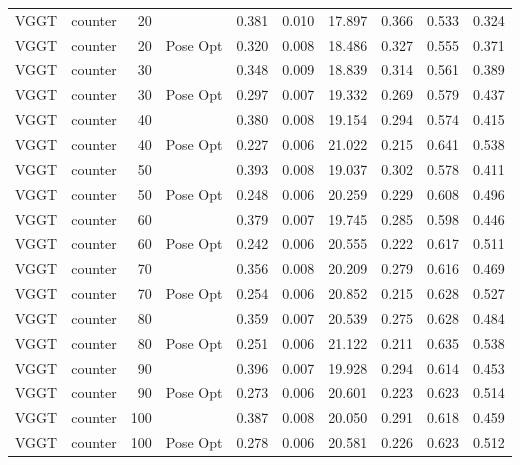 \begin{table}[H]
\begin{tabular}{llrlrrrrrr}
VGGT & counter & 20 &  & 0.381 & 0.010 & 17.897 & 0.366 & 0.533 & 0.324 \\
VGGT & counter & 20 & Pose Opt & 0.320 & 0.008 & 18.486 & 0.327 & 0.555 & 0.371 \\
VGGT & counter & 30 &  & 0.348 & 0.009 & 18.839 & 0.314 & 0.561 & 0.389 \\
VGGT & counter & 30 & Pose Opt & 0.297 & 0.007 & 19.332 & 0.269 & 0.579 & 0.437 \\
VGGT & counter & 40 &  & 0.380 & 0.008 & 19.154 & 0.294 & 0.574 & 0.415 \\
VGGT & counter & 40 & Pose Opt & 0.227 & 0.006 & 21.022 & 0.215 & 0.641 & 0.538 \\
VGGT & counter & 50 &  & 0.393 & 0.008 & 19.037 & 0.302 & 0.578 & 0.411 \\
VGGT & counter & 50 & Pose Opt & 0.248 & 0.006 & 20.259 & 0.229 & 0.608 & 0.496 \\
VGGT & counter & 60 &  & 0.379 & 0.007 & 19.745 & 0.285 & 0.598 & 0.446 \\
VGGT & counter & 60 & Pose Opt & 0.242 & 0.006 & 20.555 & 0.222 & 0.617 & 0.511 \\
VGGT & counter & 70 &  & 0.356 & 0.008 & 20.209 & 0.279 & 0.616 & 0.469 \\
VGGT & counter & 70 & Pose Opt & 0.254 & 0.006 & 20.852 & 0.215 & 0.628 & 0.527 \\
VGGT & counter & 80 &  & 0.359 & 0.007 & 20.539 & 0.275 & 0.628 & 0.484 \\
VGGT & counter & 80 & Pose Opt & 0.251 & 0.006 & 21.122 & 0.211 & 0.635 & 0.538 \\
VGGT & counter & 90 &  & 0.396 & 0.007 & 19.928 & 0.294 & 0.614 & 0.453 \\
VGGT & counter & 90 & Pose Opt & 0.273 & 0.006 & 20.601 & 0.223 & 0.623 & 0.514 \\
VGGT & counter & 100 &  & 0.387 & 0.008 & 20.050 & 0.291 & 0.618 & 0.459 \\
VGGT & counter & 100 & Pose Opt & 0.278 & 0.006 & 20.581 & 0.226 & 0.623 & 0.512 \\
\bottomrule
\end{tabular}
\end{table}